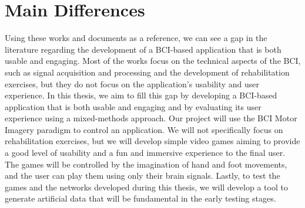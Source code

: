 \section{Main Differences}
Using these works and documents as a reference, we can see a gap in the literature regarding the development of a BCI-based application that is both usable and engaging.
Most of the works focus on the technical aspects of the BCI, such as signal acquisition and processing and the development of rehabilitation exercises, but they do not focus on the application's usability and user experience.
In this thesis, we aim to fill this gap by developing a BCI-based application that is both usable and engaging and by evaluating its user experience using a mixed-methods approach.
Our project will use the BCI Motor Imagery paradigm to control an application. We will not specifically focus on rehabilitation exercises, but we will develop simple video games aiming to provide a good level of usability and a fun and immersive experience to the final user.
The games will be controlled by the imagination of hand and foot movements, and the user can play them using only their brain signals.
Lastly, to test the games and the networks developed during this thesis, we will develop a tool to generate artificial data that will be fundamental in the early testing stages.
